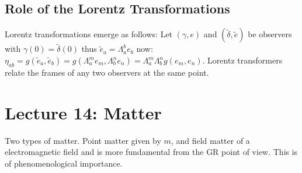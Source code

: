 \documentclass[10pt, oneside]{article}
\begin{document}
\subsection{Role of the Lorentz Transformations}
Lorentz transformations emerge as follows: Let $(\gamma,e)$ and $(\tilde{\delta},\tilde{e})$ be observers with $\gamma(0)=\tilde{\delta}(0)$ thus $\tilde{e}_a =\Lambda^b_a e_b$ now: $\eta_{ab}= g(\tilde{e}_a,\tilde{e}_b)=g(\Lambda^m_a e_m,\Lambda^n_b e_n)= \Lambda^m_a \Lambda^n_b g(e_m,e_n)$. Lorentz transformers relate the frames of any two observers at the same point.
\section{Lecture 14: Matter}
Two types of matter. Point matter given by $m$, and field matter of a electromagnetic field and is more fundamental from the GR point of view. This is of phenomenological importance. 
\end{document}
